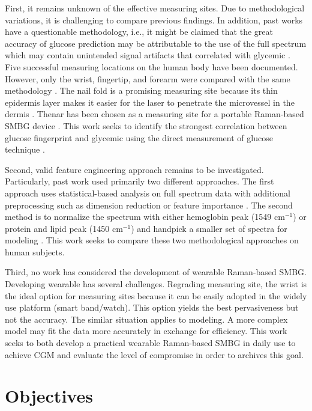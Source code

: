First, it remains unknown of the effective measuring sites.
Due to methodological variations, it is challenging to compare previous findings.  
In addition, past works have a questionable methodology, i.e., it might be claimed that the great accuracy of glucose prediction may be attributable to the use of the full spectrum which may contain unintended signal artifacts that correlated with glycemic \citep{directGlucose}.
Five successful measuring locations on the human body have been documented. 
However, only the wrist, fingertip, and forearm were compared with the same methodology \citep{sitecompare}.
The nail fold is a promising measuring site because its thin epidermis layer makes it easier for the laser to penetrate the microvessel in the dermis \citep{ramanNailFold2019}.
Thenar has been chosen as a measuring site for a portable Raman-based SMBG device \citep{glucobeam}.
This work seeks to identify the strongest correlation between glucose fingerprint and glycemic using the direct measurement of glucose technique \citep{directGlucose}.

Second, valid feature engineering approach remains to be investigated.  
Particularly, past work used primarily two different approaches. 
The first approach uses statistical-based analysis on full spectrum data with additional preprocessing such as dimension reduction or feature importance \citep{ramanNailFold2019, sitecompare, forearm2005, forearm2014}.
The second method is to normalize the spectrum with either hemoglobin peak (1549 $\text{cm}^{-1}$) \citep{solutionGlucose} or protein and lipid peak (1450 $\text{cm}^{-1}$) \citep{directGlucose} and handpick a smaller set of spectra for modeling \citep{solutionGlucose,directGlucose}.
This work seeks to compare these two methodological approaches on human subjects.

Third, no work has considered the development of wearable Raman-based SMBG.
Developing wearable has several challenges.  
Regrading measuring site, the wrist is the ideal option for measuring sites because it can be easily adopted in the widely use platform (smart band/watch).
This option yields the best pervasiveness but not the accuracy.
The similar situation applies to modeling.
A more complex model may fit the data more accurately in exchange for efficiency.
This work seeks to both develop a practical wearable Raman-based SMBG in daily use to achieve CGM and evaluate the level of compromise in order to archives this goal.

\section{Objectives}

